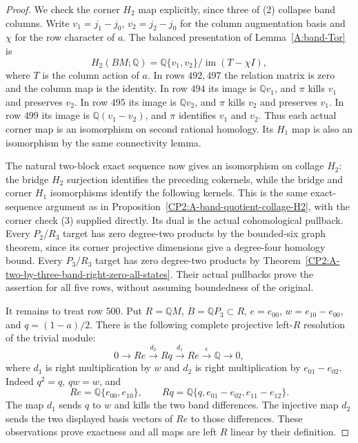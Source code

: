 \begin{proof}
We check the corner $H_2$ map explicitly, since three
of (2) collapse band columns.  Write
$v_1=j_1-j_0$, $v_2=j_2-j_0$ for the column
augmentation basis and $\chi$ for the row character
of $a$.  The balanced presentation of
Lemma~\ref{A:band-Tor} is
\[
 H_2(BM;\mathbb Q)=
 \mathbb Q\{v_1,v_2\}/\operatorname{im}(T-\chi I),            \tag{3}
\]
where $T$ is the column action of $a$.
In rows $492,497$ the relation matrix is zero and
the column map is the identity.
In row $494$ its image is $\mathbb Qv_1$,
and $\pi$ kills $v_1$ and preserves $v_2$.
In row $495$ its image is $\mathbb Qv_2$,
and $\pi$ kills $v_2$ and preserves $v_1$.
In row $499$ its image is $\mathbb Q(v_1-v_2)$,
and $\pi$ identifies $v_1$ and $v_2$.
Thus each actual corner map is an isomorphism on
second rational homology.  Its $H_1$ map is also
an isomorphism by the same connectivity lemma.

The natural two-block exact sequence now gives an
isomorphism on collage $H_2$: the bridge $H_2$
surjection identifies the preceding cokernels, while
the bridge and corner $H_1$ isomorphisms identify
the following kernels.  This is the same exact-sequence
argument as in
Proposition~\ref{CP2:A-band-quotient-collage-H2}, with
the corner check (3) supplied directly.
Its dual is the actual cohomological pullback.
Every $P_2/R_3$ target has zero degree-two products
by the bounded-six graph theorem, since its corner
projective dimensions give a degree-four homology bound.
Every $P_3/R_3$ target has zero degree-two products by
Theorem~\ref{CP2:A-two-by-three-band-right-zero-all-states}.
Their actual pullbacks prove the assertion for all
five rows, without assuming boundedness of the original.

It remains to treat row $500$.  Put $R=\mathbb QM$,
$B=\mathbb QP_3\subset R$, $e=e_{00}$,
$w=e_{10}-e_{00}$, and $q=(1-a)/2$.
There is the following complete projective left-$R$
resolution of the trivial module:
\[
 0\longrightarrow Re\xrightarrow{d_2}Rq
   \xrightarrow{d_1}Re\xrightarrow{\epsilon}\mathbb Q
   \longrightarrow0,                                        \tag{4}
\]
where $d_1$ is right multiplication by $w$ and $d_2$
is right multiplication by $e_{01}-e_{02}$.
Indeed $q^2=q$, $qw=w$, and
\[
 Re=\mathbb Q\{e_{00},e_{10}\},\qquad
 Rq=\mathbb Q\{q,e_{01}-e_{02},e_{11}-e_{12}\}.
\]
The map $d_1$ sends $q$ to $w$ and kills the two
band differences.  The injective map $d_2$ sends the
two displayed basis vectors of $Re$ to those differences.
These observations prove exactness and all maps are
left $R$ linear by their definition.


\end{proof}
